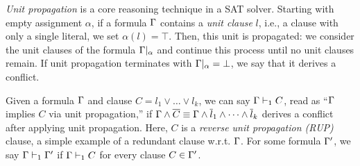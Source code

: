 %
%
%
\emph{Unit propagation} is a core reasoning technique in a SAT solver. Starting
with empty assignment $\alpha$, if a formula $\Gamma$ contains a \emph{unit
clause} $l$, i.e., a clause with only a single literal, we set $\alpha(l) =
\top$. Then, this unit is propagated: we consider the unit clauses of the formula $\Gamma|_\alpha$
and continue this process until no unit clauses remain. If unit propagation
terminates with $\Gamma|_\alpha = \bot$, we say that it derives a conflict.
%
%

Given a formula $\Gamma$ and clause $C = l_1 \lor \dots \lor l_k$, we can say
$\Gamma \vdash_1 C$, read as ``$\Gamma$ implies $C$ via unit propagation,''
if $\Gamma \land \overline{C} \equiv \Gamma \land \overline{l}_1 \land \dots
\land \overline{l}_k$ derives a conflict after applying unit propagation. 
Here, $C$ is a \emph{reverse unit propagation (RUP)}
clause, a simple example of a redundant clause w.r.t. $\Gamma$. For some formula
$\Gamma'$, we say $\Gamma \vdash_1 \Gamma'$ if $\Gamma \vdash_1 C$ for every 
clause $C \in \Gamma'$.


